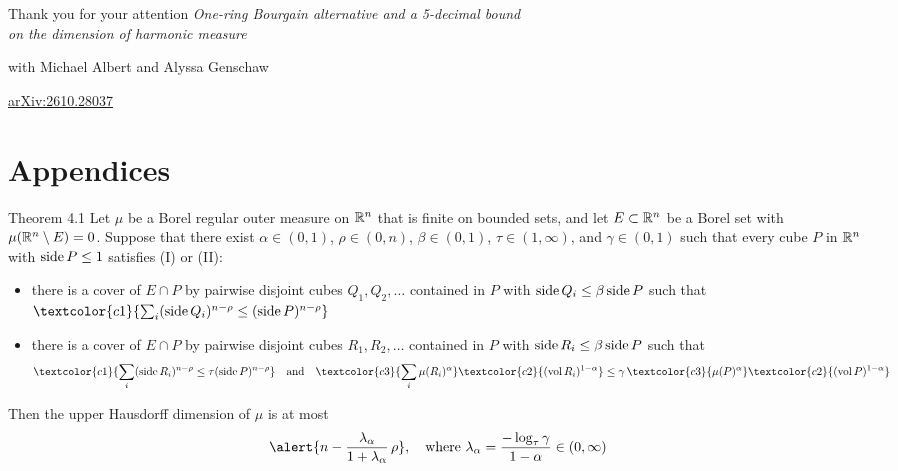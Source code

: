 \slide[valign=center, align=center]{}
\huge{Thank you for your attention}
\vspace{1.2em}
\large{\textit{One-ring Bourgain alternative and a 5-decimal bound\\ on the dimension of harmonic measure}}

with Michael Albert and Alyssa Genschaw

\href{https://arxiv.org/abs/2610.28037}{arXiv:2610.28037}

\appendix
\section*{Appendices}

\begin{theorem}{Theorem 4.1}
Let $\mu$ be a Borel regular outer measure on $\mathbb{R}^n$ that is finite on bounded sets, and let $E\subset\mathbb{R}^n$ be a Borel set with $\mu(\mathbb{R}^n\setminus E)=0$. Suppose that there exist $\alpha\in(0,1)$, $\rho\in(0,n)$, $\beta\in(0,1)$, $\tau\in(1,\infty)$, and $\gamma\in(0,1)$ such that every cube $P$ in $\mathbb{R}^n$ with $\operatorname{side} P\leq1$ satisfies (I) or (II):
\begin{itemize}
\item[\textcolor{c1}{(I)}] there is a cover of $E\cap P$ by pairwise disjoint cubes $Q_1,Q_2,\dots$ contained in $P$ with $\operatorname{side} Q_i\leq\beta\operatorname{side} P$ such that $\textcolor{c1}{\sum_i(\side Q_i)^{n-\rho}\leq(\side P)^{n-\rho}}$
\item[\textcolor{c3}{(II)}] there is a cover of $E\cap P$ by pairwise disjoint cubes $R_1,R_2,\dots$ contained in $P$ with $\operatorname{side} R_i\leq\beta\operatorname{side} P$ such that
$$\textcolor{c1}{\sum_i(\side R_i)^{n-\rho}\leq\tau(\side P)^{n-\rho}}\quad\text{and}\quad\textcolor{c3}{\sum_i\mu(R_i)^\alpha}\textcolor{c2}{(\vol R_i)^{1-\alpha}}\leq\gamma\,\textcolor{c3}{\mu(P)^\alpha}\textcolor{c2}{(\vol P)^{1-\alpha}}$$
\end{itemize}
Then the upper Hausdorff dimension of $\mu$ is at most
$$\alert{n-\frac{\lambda_\alpha}{1+\lambda_\alpha}\,\rho},\quad\text{where }\lambda_\alpha=\frac{-\log_\tau\gamma}{1-\alpha}\in(0,\infty)$$
\end{theorem}

